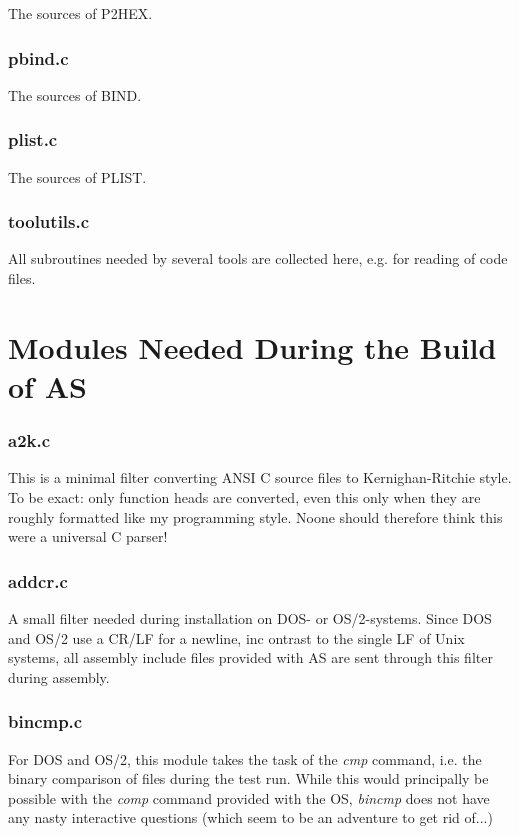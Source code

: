 \documentclass[12pt,twoside]{report}
\begin{document}
The sources of P2HEX.

\subsubsection{pbind.c}

The sources of BIND.

\subsubsection{plist.c}

The sources of PLIST.

\subsubsection{toolutils.c}

All subroutines needed by several tools are collected here, e.g. for
reading of code files.

\section{Modules Needed During the Build of AS}

\subsubsection{a2k.c}

This is a minimal filter converting ANSI C source files to
Kernighan-Ritchie style.  To be exact: only function heads are converted,
even this only when they are roughly formatted like my programming style.
Noone should therefore think this were a universal C parser!

\subsubsection{addcr.c}

A small filter needed during installation on DOS- or OS/2-systems.  Since
DOS and OS/2 use a CR/LF for a newline, inc ontrast to the single LF of
Unix systems, all assembly include files provided with AS are sent through
this filter during assembly.

\subsubsection{bincmp.c}

For DOS and OS/2, this module takes the task of the {\em cmp} command,
i.e. the binary comparison of files during the test run.  While this would
principally be possible with the {\em comp} command provided with the OS,
{\em bincmp} does not have any nasty interactive questions (which seem to
be an adventure to get rid of...)
\end{document}
